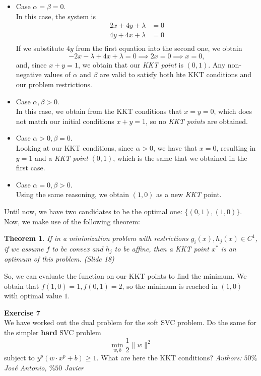 \documentclass[11pt,table]{article}
\newtheorem{nth}{Theorem}
\newenvironment{problem}[2][Exercise]
{ \begin{mdframed}[backgroundcolor=gray!20] \textbf{#1 #2} \\}
	{\hspace{0.0cm}\newline\newline \emph{Authors: \(50\%\) José Antonio, \(\%50\) Javier}  \end{mdframed}}
\newcommand\norm[1]{\lVert#1\rVert}
\begin{document}
\begin{itemize}
	\item Case \(\alpha = \beta = 0\).\\
	      In this case, the system is
	      \begin{align*}
		      2x + 4y + \lambda & = 0 \\
		      4y + 4x + \lambda & = 0 \\
	      \end{align*}
	      If we substitute \(4y\) from the first equation into the second one, we obtain
	      \[
		      -2x - \lambda + 4x + \lambda = 0 \implies 2x = 0  \implies x = 0,
	      \]
	      and, since \(x+y = 1\), we obtain that our \emph{KKT point} is \((0,1)\). Any non-negative values of $\alpha$ and $\beta$ are valid to satisfy both hte KKT conditions and our problem restrictions.
	\item Case \(\alpha, \beta > 0\).\\
	      In this case, we obtain from the KKT conditions that \(x=  y = 0\), which does not match our initial conditions \(x+y = 1\), so no \emph{KKT points} are obtained.
	\item Case \(\alpha > 0, \beta = 0\).\\
	      Looking at our KKT conditions, since \(\alpha > 0\), we have that \(x = 0\), resulting in \(y=1\) and a \emph{KKT point} \((0,1)\), which is the same that we obtained in the first case.\\
	\item Case \(\alpha = 0, \beta > 0\).\\
	      Using the same reasoning, we obtain \((1,0)\) as a new \emph{KKT} point.
\end{itemize}

Until now, we have two candidates to be the optimal one: \(\{(0,1),(1,0)\}\). Now, we make use of the following theorem:

\begin{nth}
	If in a minimization problem with restrictions \(g_i(x), h_j(x) \in C^1\), if we assume \(f\) to be convex and \(h_j\) to be affine, then a KKT point \(x^*\) is an optimum of this problem. (Slide 18)
\end{nth}

So, we can evaluate the function on our KKT points to find the minimum. We obtain that \(f(1,0) = 1, f(0,1) = 2\), so the minimum is reached in \((1,0)\) with optimal value \(1\). \\

\begin{problem}{7}
We have worked out the dual problem for the soft SVC problem. Do the same for the simpler \textbf{hard} SVC problem
\[
	\min_{w,b} \frac{1}{2} \norm{w}^2
\]
subject to \(y^p\left(w \cdot x^p + b\right) \geq 1\). What are here the KKT conditions?
\end{problem}
\end{document}
